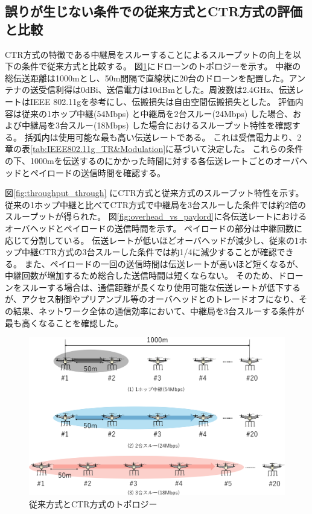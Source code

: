 \documentclass[a4paper,10.5pt]{ltjsarticle}
\begin{document}
\subsection{誤りが生じない条件での従来方式とCTR方式の評価と比較}
CTR方式の特徴である中継局をスルーすることによるスループットの向上を以下の条件で従来方式と比較する。
図\ref{fig:CTR_model}にドローンのトポロジーを示す。
中継の総伝送距離は1000mとし、50m間隔で直線状に20台のドローンを配置した。アンテナの送受信利得は0dBi、送信電力は10dBmとした。周波数は2.4GHz、伝送レートはIEEE 802.11gを参考にし、伝搬損失は自由空間伝搬損失とした。
評価内容は従来の1ホップ中継(54Mbps) と中継局を2台スルー(24Mbps) した場合、および中継局を3台スルー(18Mbps) した場合におけるスループット特性を確認する。
括弧内は使用可能な最も高い伝送レートである。
これは受信電力より、2章の表\ref{tab:IEEE802.11g_TR&Modulation}に基づいて決定した。
これらの条件の下、1000mを伝送するのにかかった時間に対する各伝送レートごとのオーバヘッドとペイロードの送信時間を確認する。

図\ref{fig:throughput_through} にCTR方式と従来方式のスループット特性を示す。従来の1ホップ中継と比べてCTR方式で中継局を3台スルーした条件では約2倍のスループットが得られた。
図\ref{fig:overhead_vs_paylord}に各伝送レートにおけるオーバヘッドとペイロードの送信時間を示す。
ペイロードの部分は中継回数に応じて分割している。
伝送レートが低いほどオーバヘッドが減少し、従来の1ホップ中継CTR方式の3台スルーした条件では約1/4に減少することが確認できる。
また、ペイロードの一回の送信時間は伝送レートが高いほど短くなるが、中継回数が増加するため総合した送信時間は短くならない。
そのため、ドローンをスルーする場合は、通信距離が長くなり使用可能な伝送レートが低下するが、アクセス制御やプリアンブル等のオーバヘッドとのトレードオフになり、その結果、ネットワーク全体の通信効率において、中継局を3台スルーする条件が最も高くなることを確認した。


\begin{figure}[H]
  \centering
  \includegraphics[width=\linewidth]{CTR_model.pdf} %
  \caption{従来方式とCTR方式のトポロジー}
  \label{fig:CTR_model} %
\end{figure}
\end{document}
